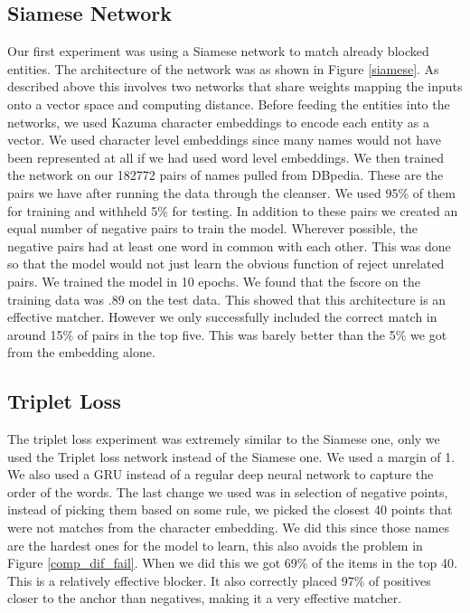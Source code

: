 \subsection{Siamese Network}
Our first experiment was using a Siamese network to match already blocked entities. The architecture of the network was as shown in Figure \ref{siamese}. As described above this involves two networks that share weights mapping the inputs onto a vector space and computing distance. Before feeding the entities into the networks, we used Kazuma character embeddings to encode each entity as a vector. We used character level embeddings since many names would not have been represented at all if we had used word level embeddings. We then trained the network on our 182772 pairs of names pulled from DBpedia. These are the pairs we have after running the data through the cleanser. We used 95\% of them for training and withheld 5\% for testing. In addition to these pairs we created an equal number of negative pairs to train the model. Wherever possible, the negative pairs had at least one word in common with each other. This was done so that the model would not just learn the obvious function of reject unrelated pairs. We trained the model in 10 epochs. We found that the fscore on the training data was .89 on the test data. This showed that this architecture is an effective matcher. However we only successfully included the correct match in around 15\% of pairs in the top five. This was barely better than the 5\% we got from the embedding alone.
\subsection{Triplet Loss}
The triplet loss experiment was extremely similar to the Siamese one, only we used the Triplet loss network instead of the Siamese one. We used a margin of 1. We also used a GRU instead of a regular deep neural network to capture the order of the words. The last change we used was in selection of negative points, instead of picking them based on some rule, we picked the closest 40 points that were not matches from the character embedding. We did this since those names are the hardest ones for the model to learn, this also avoids the problem in Figure \ref{comp_dif_fail}. When we did this we got 69\% of the items in the top 40. This is a relatively effective blocker. It also correctly placed 97\% of positives closer to the anchor than negatives, making it a very effective matcher.